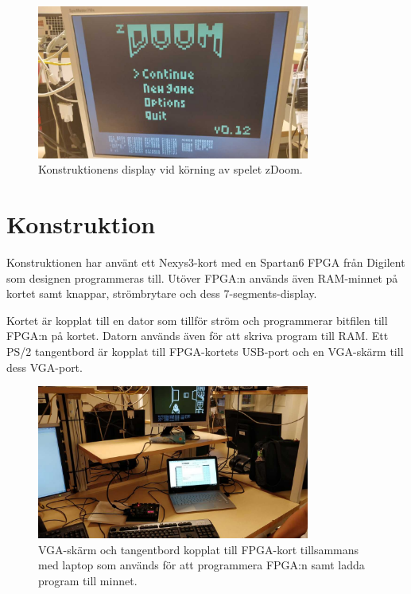 \documentclass[main.tex]{subfiles}
\begin{document}
\newpage

\begin{figure}
    \center
    \includegraphics[width=0.8\textwidth,bb=0 0 1152 648]{img/monitor_small.jpg}
    \caption{Konstruktionens display vid körning av spelet zDoom.}
\end{figure}

\section{Konstruktion}
Konstruktionen har använt ett Nexys3-kort med en Spartan6 FPGA från Digilent
som designen programmeras till. Utöver FPGA:n används även RAM-minnet på kortet
samt knappar, strömbrytare och dess 7-segments-display.

Kortet är kopplat till en dator som tillför ström och programmerar bitfilen
till FPGA:n på kortet. Datorn används även för att skriva program till RAM.
Ett PS/2 tangentbord är kopplat till FPGA-kortets USB-port och en VGA-skärm
till dess VGA-port.  

\begin{figure}
    \center
    \includegraphics[width=0.8\textwidth,bb=0 0 1152 648]{img/setup_small.jpg}
    \caption{VGA-skärm och tangentbord kopplat till FPGA-kort tillsammans med
    laptop som används för att programmera FPGA:n samt ladda program till
    minnet.}
\end{figure}
\end{document}
